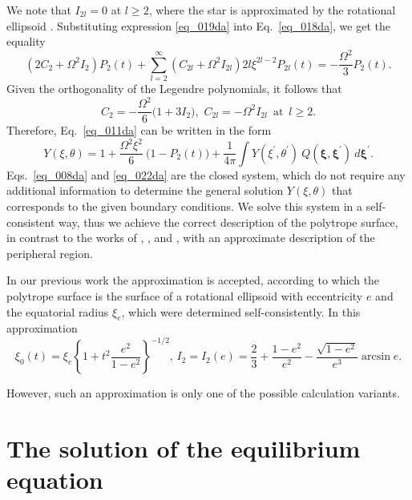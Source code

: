 \documentclass{caosp308}
\begin{document}
We note that $I_{2l}=0$ at $l\geq2$, where the star is approximated by the rotational ellipsoid \citep{1969efe..book.....C}. Substituting expression \eqref{eq_019da} into Eq.~\eqref{eq_018da}, we get the equality
\begin{equation}
\label{eq_020da}
(2C_2+\Omega^2I_2)P_2(t)+\sum\limits_{l=2}^\infty(C_{2l}+\Omega^2I_{2l})2l\xi^{2l-2}P_{2l}(t)=-\frac{\Omega^2}{3}P_{2}(t).
\end{equation}
Given the orthogonality of the Legendre polynomials, it follows that
\begin{equation}
\label{eq_021da}
C_2=-\frac{\Omega^2}{6}\biggl(1+3I_2\biggr),\,\,C_{2l}=-\Omega^2I_{2l}\,\,\,\text{at}\,\,\,l\geq2.
\end{equation}
Therefore, Eq.~\eqref{eq_011da} can be written in the form
\begin{equation}
\label{eq_022da}
Y (\xi,\theta)=1+\frac{\Omega^2\xi^2}{6}\:\biggl(1-P_2 (t)\biggr)
+\frac{1}{4\pi}\int Y (\xi^{'}, \theta^{'})\:Q ({\boldsymbol\xi},{\boldsymbol\xi}^{'})\:d{\boldsymbol\xi}^{'}.
\end{equation}
Eqs.~\eqref{eq_008da} and \eqref{eq_022da} are the closed system, which do not require any additional information to determine the general solution $Y (\xi,\theta)$ that corresponds to the given boundary conditions. We solve this system in a self-consistent way, thus we achieve the correct description of the polytrope surface, in contrast to the works of  \citet{1923MNRAS..83..118M}, \citet{1933MNRAS..93..390C}, and \citet*{1965MNRAS.131...13M}, with an approximate description of the peripheral region.

In our previous work \citep{2019MMC.6...153V} the approximation is accepted, according to which the polytrope surface is the surface of a rotational ellipsoid with eccentricity $e$ and the equatorial radius $\xi_e$, which were determined self-consistently. In this approximation \citep{2019MMC.6...153V} 
\begin{equation}
\label{eq_023da}
\xi_0(t)=\xi_e\left\{1+t^2\frac{e^2}{1-e^2}\right\}^{-1/2},\,
I_2=I_2(e)=\frac{2}{3}+\frac{1-e^2}{e^2}-\frac{\sqrt{1-e^2}}{e^3}\arcsin e.
\end{equation}

However, such an approximation is only one of the possible calculation variants.


\section{The solution of the equilibrium equation}
\label{sect_03da}
\end{document}
